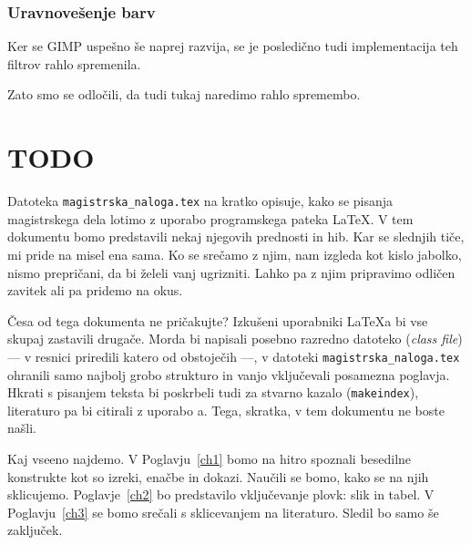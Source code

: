 \subsection{Uravnovešenje barv}

Ker se GIMP uspešno še naprej razvija, se je posledično tudi implementacija teh filtrov rahlo spremenila. 

Zato smo se odločili, da tudi tukaj naredimo rahlo spremembo. 


\chapter{TODO}
Datoteka {\tt magistrska\_naloga.tex} na kratko opisuje, kako se pisanja magistrskega dela lotimo z uporabo programskega pateka \LaTeX. V tem dokumentu bomo predstavili nekaj njegovih prednosti in hib. Kar se slednjih tiče, mi pride na misel ena sama. Ko se srečamo z njim, nam izgleda kot kislo jabolko, nismo prepričani, da bi želeli vanj ugrizniti. Lahko pa z njim pripravimo odličen zavitek ali pa pridemo na okus.

Česa od tega dokumenta ne pričakujte? Izkušeni uporabniki \LaTeX{}a bi vse skupaj zastavili
drugače. Morda bi napisali posebno razredno datoteko (\emph{class file}) --- v resnici priredili katero od obstoječih ---, v datoteki {\tt magistrska\_naloga.tex} ohranili samo najbolj grobo strukturo in vanjo vključevali  posamezna po\-glav\-ja. Hkrati s pisanjem teksta bi poskrbeli tudi za stvarno kazalo ({\tt makeindex}), literaturo pa bi citirali z uporabo {\BibTeX}{a}. Tega, skratka, v tem dokumentu ne boste našli.

Kaj vseeno najdemo. V Poglavju~\ref{ch1} bomo na hitro spoznali besedilne konstrukte kot so izreki, enačbe in dokazi. Naučili se bomo, kako se na njih sklicujemo. Poglavje~\ref{ch2} bo predstavilo vključevanje plovk: slik in tabel. V Poglavju~\ref{ch3} se bomo srečali s sklicevanjem na literaturo.
Sledil bo samo še zaključek.

